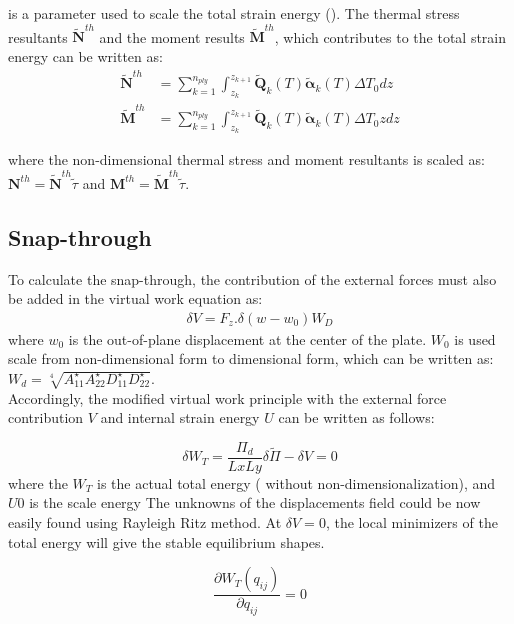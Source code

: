 \documentclass[journal]{new-aiaa}
\begin{document}
is a parameter used to scale the total strain energy (\cite{Pirrera2010}).
The thermal stress resultants $\tilde{\bm{N}}^{th}$ and the moment results $\tilde{\bm{M}}^{th}$, which contributes to the total strain energy can be written as:
\begin{equation}
\begin{aligned}
\tilde{\bm{N}}^{th}&=\sum_{k=1}^{n_{ply}}\int_{z_k}^{z_{k+1}}\tilde{\bm{Q}}_k\left(T\right)\tilde{\bm{\alpha}}_k\left(T\right) \Delta T_0 dz \\
\tilde{\bm{M}}^{th}&=\sum_{k=1}^{n_{ply}}\int_{z_k}^{z_{k+1}}\tilde{\bm{Q}}_k\left(T\right)\tilde{\bm{\alpha}}_k\left(T\right) \Delta T_0 zdz
\end{aligned}
\end{equation}

where the non-dimensional thermal stress and moment resultants is scaled as: $\bm{N}^{th}=\tilde{\bm{N}}^{th}\tilde{\tau}$ and    $\bm{M}^{th}=\tilde{\bm{M}}^{th}\tilde{\tau}$.
\subsection{Snap-through}
To calculate the snap-through, the contribution of the external forces must also be added in the virtual work equation as:
\begin{equation}
\begin{aligned}
\label{virtualwork1}
\delta V= F_z.\delta( w -w_0)W_D
\end{aligned}
\end{equation}
where $w_0$ is the out-of-plane displacement at the center of the plate.
$W_0$ is used scale from non-dimensional form to dimensional form, which can be written as:
$W_d= \sqrt[4]{A_{11}^\star A_{22}^\star D_{11}^\star D_{22}^\star}$. \\
Accordingly, the modified virtual work principle with the external force contribution $V$ and internal strain energy $U$ can be written as follows:

\begin{equation}
\label{virtualwork3}
\delta W_{T}= \frac{\Pi_d}{LxLy}\delta\tilde{\Pi} - \delta V=0 
\end{equation}
where the $W_T$ is the actual total energy ( without non-dimensionalization), and $U0$ is the scale energy
The unknowns of the displacements field could be now easily found using Rayleigh Ritz method. At $\delta V=0$, the local minimizers of the total energy will give the stable equilibrium shapes. 


\begin{equation}
\label{virtualwork4}
\frac{\partial W_{T}(q_{ij})}{\partial q_{ij}} =0 
\end{equation}
\end{document}
